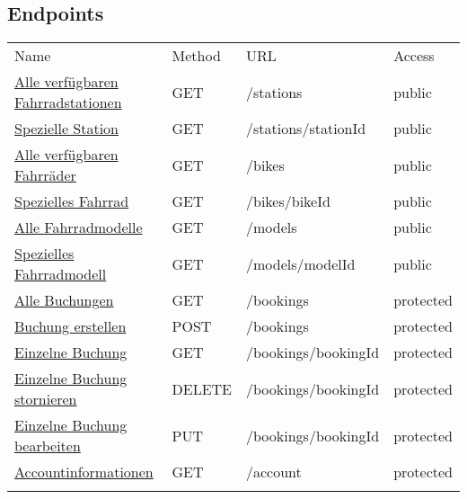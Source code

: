 \subsection{Endpoints}\label{endpoints}

\begin{longtable}[c]{@{}llll@{}}
\toprule\addlinespace
Name & Method & URL & Access
\\\addlinespace
\midrule\endhead
\href{Get\%20stations}{Alle verfügbaren Fahrradstationen} & GET &
/stations & public
\\\addlinespace
\href{Get\%20station}{Spezielle Station} & GET & /stations/stationId &
public
\\\addlinespace
\href{Get\%20bikes}{Alle verfügbaren Fahrräder} & GET & /bikes & public
\\\addlinespace
\href{Get\%20bike}{Spezielles Fahrrad} & GET & /bikes/bikeId & public
\\\addlinespace
\href{Get\%20bike\%20models}{Alle Fahrradmodelle} & GET & /models &
public
\\\addlinespace
\href{Get\%20bike\%20model}{Spezielles Fahrradmodell} & GET &
/models/modelId & public
\\\addlinespace
\href{Get\%20bookings}{Alle Buchungen} & GET & /bookings & protected
\\\addlinespace
\href{Create\%20booking}{Buchung erstellen} & POST & /bookings &
protected
\\\addlinespace
\href{Get\%20booking}{Einzelne Buchung} & GET & /bookings/bookingId &
protected
\\\addlinespace
\href{Delete\%20booking}{Einzelne Buchung stornieren} & DELETE &
/bookings/bookingId & protected
\\\addlinespace
\href{Edit\%20booking}{Einzelne Buchung bearbeiten} & PUT &
/bookings/bookingId & protected
\\\addlinespace
\href{Get\%20account\%20informations}{Accountinformationen} & GET &
/account & protected
\\\addlinespace
\bottomrule
\end{longtable}
